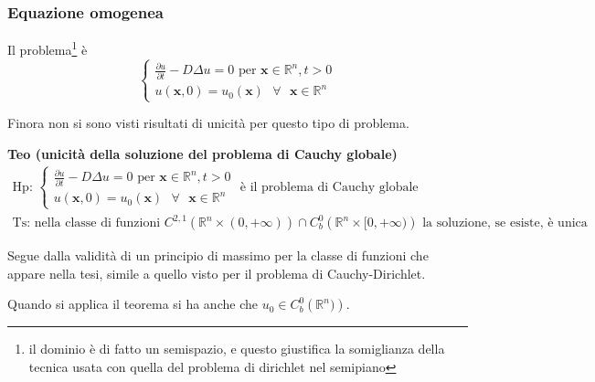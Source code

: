 \documentclass{article}
\begin{document}
\subsubsection{Equazione omogenea}

Il problema\footnote{%
il dominio \`{e} di fatto un semispazio, e questo giustifica la somiglianza
della tecnica usata con quella del problema di dirichlet nel semipiano} \`{e}%
\begin{equation*}
\left\{ 
\begin{array}{c}
\frac{\partial u}{\partial t}-D\Delta u=0\text{ per }\mathbf{x}\in 
\mathbb{R}
^{n},t>0 \\ 
u\left( \mathbf{x},0\right) =u_{0}\left( \mathbf{x}\right) \text{ }\forall 
\text{ }\mathbf{x}\in 
\mathbb{R}
^{n}%
\end{array}%
\right.
\end{equation*}

Finora non si sono visti risultati di unicit\`{a} per questo tipo di
problema.

\textbf{Teo (unicit\`{a} della soluzione del problema di Cauchy globale)}%
\begin{gather*}
\text{Hp: }\left\{ 
\begin{array}{c}
\frac{\partial u}{\partial t}-D\Delta u=0\text{ per }\mathbf{x}\in 
\mathbb{R}
^{n},t>0 \\ 
u\left( \mathbf{x},0\right) =u_{0}\left( \mathbf{x}\right) \text{ }\forall 
\text{ }\mathbf{x}\in 
\mathbb{R}
^{n}%
\end{array}%
\right. \text{ \`{e} il problema di Cauchy globale} \\
\text{Ts: nella classe di funzioni }C^{2,1}\left( 
\mathbb{R}
^{n}\times \left( 0,+\infty \right) \right) \cap C_{b}^{0}\left( 
\mathbb{R}
^{n}\times \lbrack 0,+\infty )\right) \text{ la soluzione, se esiste, \`{e}
unica}
\end{gather*}

Segue dalla validit\`{a} di un principio di massimo per la classe di
funzioni che appare nella tesi, simile a quello visto per il problema di
Cauchy-Dirichlet.

Quando si applica il teorema si ha anche che $u_{0}\in C_{b}^{0}\left( 
\mathbb{R}
^{n})\right) $.
\end{document}
